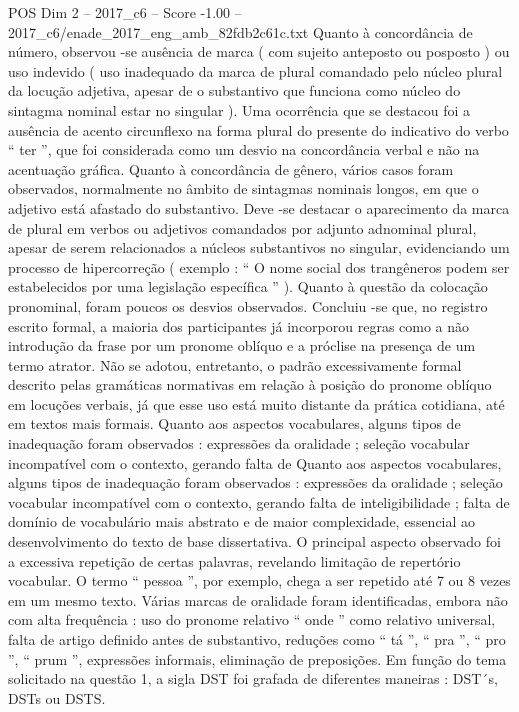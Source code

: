\begin{textsample}{POS Dim 2 – 2017\_c6 – Score -1.00 – 2017\_c6/enade\_2017\_eng\_amb\_82fdb2c61c.txt}
Quanto à concordância de número, observou -se ausência de marca ( com sujeito anteposto ou posposto ) ou uso indevido ( uso inadequado da marca de plural comandado pelo núcleo plural da locução adjetiva, apesar de o substantivo que funciona como núcleo do sintagma nominal estar no singular ).
Uma ocorrência que se destacou foi a ausência de acento circunflexo na forma plural do presente do indicativo do verbo “ ter ”, que foi considerada como um desvio na concordância verbal e não na acentuação gráfica.
Quanto à concordância de gênero, vários casos foram observados, normalmente no âmbito de sintagmas nominais longos, em que o adjetivo está afastado do substantivo.
Deve -se destacar o aparecimento da marca de plural em verbos ou adjetivos comandados por adjunto adnominal plural, apesar de serem relacionados a núcleos substantivos no singular, evidenciando um processo de hipercorreção ( exemplo : “ O nome social dos trangêneros podem ser estabelecidos por uma legislação específica ” ).
Quanto à questão da colocação pronominal, foram poucos os desvios observados.
Concluiu -se que, no registro escrito formal, a maioria dos participantes já incorporou regras como a não introdução da frase por um pronome oblíquo e a próclise na presença de um termo atrator.
Não se adotou, entretanto, o padrão excessivamente formal descrito pelas gramáticas normativas em relação à posição do pronome oblíquo em locuções verbais, já que esse uso está muito distante da prática cotidiana, até em textos mais formais.
Quanto aos aspectos vocabulares, alguns tipos de inadequação foram observados : expressões da oralidade ; seleção vocabular incompatível com o contexto, gerando falta de Quanto aos aspectos vocabulares, alguns tipos de inadequação foram observados : expressões da oralidade ; seleção vocabular incompatível com o contexto, gerando falta de inteligibilidade ; falta de domínio de vocabulário mais abstrato e de maior complexidade, essencial ao desenvolvimento do texto de base dissertativa.
O principal aspecto observado foi a excessiva repetição de certas palavras, revelando limitação de repertório vocabular.
O termo “ pessoa ”, por exemplo, chega a ser repetido até 7 ou 8 vezes em um mesmo texto.
Várias marcas de oralidade foram identificadas, embora não com alta frequência : uso do pronome relativo “ onde ” como relativo universal, falta de artigo definido antes de substantivo, reduções como “ tá ”, “ pra ”, “ pro ”, “ prum ”, expressões informais, eliminação de preposições.
Em função do tema solicitado na questão 1, a sigla DST foi grafada de diferentes maneiras : DST´s, DSTs ou DSTS.

\end{textsample}
